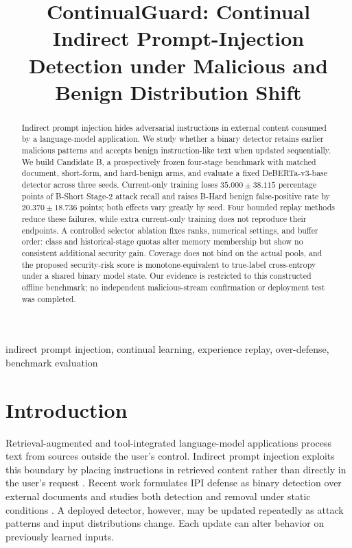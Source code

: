 \documentclass[conference]{IEEEtran}
\title{ContinualGuard: Continual Indirect Prompt-Injection Detection under Malicious and Benign Distribution Shift}
\author{\IEEEauthorblockN{Leshan Tang, Haoxiang Liao}
\IEEEauthorblockA{The University of Auckland, Auckland, New Zealand}}
\begin{document}
\maketitle
\begin{abstract}
Indirect prompt injection hides adversarial instructions in external content consumed by a language-model application. We study whether a binary detector retains earlier malicious patterns and accepts benign instruction-like text when updated sequentially. We build Candidate B, a prospectively frozen four-stage benchmark with matched document, short-form, and hard-benign arms, and evaluate a fixed DeBERTa-v3-base detector across three seeds. Current-only training loses $35.000\pm38.115$ percentage points of B-Short Stage-2 attack recall and raises B-Hard benign false-positive rate by $20.370\pm18.736$ points; both effects vary greatly by seed. Four bounded replay methods reduce these failures, while extra current-only training does not reproduce their endpoints. A controlled selector ablation fixes ranks, numerical settings, and buffer order: class and historical-stage quotas alter memory membership but show no consistent additional security gain. Coverage does not bind on the actual pools, and the proposed security-risk score is monotone-equivalent to true-label cross-entropy under a shared binary model state. Our evidence is restricted to this constructed offline benchmark; no independent malicious-stream confirmation or deployment test was completed.
\end{abstract}
\begin{IEEEkeywords}
indirect prompt injection, continual learning, experience replay, over-defense, benchmark evaluation
\end{IEEEkeywords}


\section{Introduction}
Retrieval-augmented and tool-integrated language-model applications process text from sources outside the user's control. Indirect prompt injection exploits this boundary by placing instructions in retrieved content rather than directly in the user's request \cite{greshake2023indirect}. Recent work formulates IPI defense as binary detection over external documents and studies both detection and removal under static conditions \cite{chen2025indirect}. A deployed detector, however, may be updated repeatedly as attack patterns and input distributions change. Each update can alter behavior on previously learned inputs.
\end{document}
